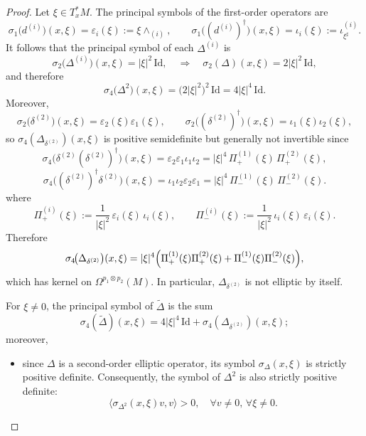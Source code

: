 \documentclass[10pt,a4paper]{amsart}
\begin{document}
\begin{proof}
Let $\xi\in T_x^*M$.
The principal symbols of the first-order operators are
\[
\sigma_1\!\bigl(d^{(i)}\bigr)(x,\xi)=\varepsilon_i(\xi):=\xi\wedge_{(i)},\qquad
\sigma_1\!\bigl((d^{(i)})^\dagger\bigr)(x,\xi)=\iota_i(\xi):=\iota^{(i)}_{\xi^\sharp}.
\]
It follows that the principal symbol of each $\Delta^{(i)}$ is
\begin{equation*}\label{eq:principal-symbol-slot-laplacian}
\sigma_2\!\bigl(\Delta^{(i)}\bigr)(x,\xi)=|\xi|^2\,\mathrm{Id},
\quad\Rightarrow\quad
\sigma_2(\Delta)(x,\xi)=2|\xi|^2\,\mathrm{Id},
\end{equation*}
and therefore
\begin{equation*}\label{eq:principal-symbol-Delta-square}
\sigma_4\!\bigl(\Delta^2\bigr)(x,\xi)=\bigl(2|\xi|^2\bigr)^2\,\mathrm{Id}=4|\xi|^4\,\mathrm{Id}.
\end{equation*}
Moreover,
\[
\sigma_2\!\bigl(\delta^{(2)}\bigr)(x,\xi)=\varepsilon_2(\xi)\varepsilon_1(\xi),
\qquad
\sigma_2\!\bigl((\delta^{(2)})^\dagger\bigr)(x,\xi)=\iota_1(\xi)\iota_2(\xi),
\]
so $\sigma_4(\Delta_{\delta^{(2)}})(x,\xi)$ is positive semidefinite but generally not invertible since
\[
\sigma_4\!\bigl(\delta^{(2)}(\delta^{(2)})^\dagger\bigr)(x,\xi)
=\varepsilon_2\varepsilon_1\iota_1\iota_2
=|\xi|^4\,\Pi^{(1)}_{+}(\xi)\,\Pi^{(2)}_{+}(\xi),
\]
\[
\sigma_4\!\bigl((\delta^{(2)})^\dagger\delta^{(2)}\bigr)(x,\xi)
=\iota_1\iota_2\varepsilon_2\varepsilon_1
=|\xi|^4\,\Pi^{(1)}_{-}(\xi)\,\Pi^{(2)}_{-}(\xi).
\]
where
\[
\Pi^{(i)}_{+}(\xi):=\frac{1}{|\xi|^2}\,\varepsilon_i(\xi)\,\iota_i(\xi),\qquad
\Pi^{(i)}_{-}(\xi):=\frac{1}{|\xi|^2}\,\iota_i(\xi)\,\varepsilon_i(\xi).
\]
Therefore
\begin{equation}\label{eq:symbol-Delta-delta2}
\sigma_4\!\bigl(\Delta_{\delta^{(2)}}\bigr)(x,\xi)
=|\xi|^4\Bigl(\Pi^{(1)}_{+}(\xi)\Pi^{(2)}_{+}(\xi)+\Pi^{(1)}_{-}(\xi)\Pi^{(2)}_{-}(\xi)\Bigr),
\end{equation}
which has kernel on $\Omega^{p_1 \otimes p_2}(M)$.
In particular, $\Delta_{\delta^{(2)}}$ is not elliptic by itself.

For $\xi\neq 0$, the principal symbol of $\widetilde{\Delta}$ is the sum
\[
\sigma_4(\widetilde{\Delta})(x,\xi)
=
4|\xi|^4\,\mathrm{Id}+\sigma_4(\Delta_{\delta^{(2)}})(x,\xi);
\]
moreover,
\begin{itemize}
    \item since $\Delta$ is a second-order elliptic operator, its symbol $\sigma_{\Delta}(x, \xi)$ is strictly positive definite. Consequently, the symbol of $\Delta^2$ is also strictly positive definite:
    \begin{equation}
    \langle \sigma_{\Delta^2}(x, \xi) v, v \rangle > 0, \quad \forall v \neq 0, \, \forall \xi \neq 0.
    \end{equation}
    

\end{itemize}
\end{proof}
\end{document}
